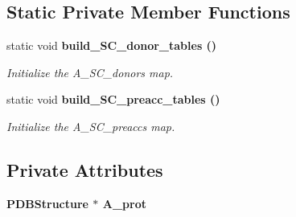 \subsection*{Static Private Member Functions}
\begin{CompactItemize}
\item 
static void \bf{build\_\-SC\_\-donor\_\-tables} ()\label{classASCbase_1_1HbondGeometry_65a97cfb3b7745f402c1742c47d83866}

\begin{CompactList}\small\item\em Initialize the A\_\-SC\_\-donors map. \item\end{CompactList}\item 
static void \bf{build\_\-SC\_\-preacc\_\-tables} ()\label{classASCbase_1_1HbondGeometry_3d28b9c70a52f5b6897c94147b860f14}

\begin{CompactList}\small\item\em Initialize the A\_\-SC\_\-preaccs map. \item\end{CompactList}\end{CompactItemize}
\subsection*{Private Attributes}
\begin{CompactItemize}
\item 
\bf{PDBStructure} $\ast$ \textbf{A\_\-prot}\label{classASCbase_1_1HbondGeometry_8da82662a17685bfe0ce02f2d4d6ba6a}

\end{CompactItemize}
